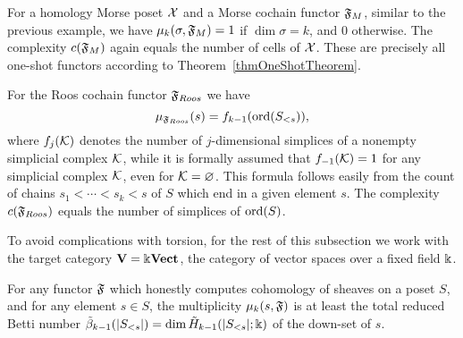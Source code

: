 \begin{ex}\label{exMultiplicityMorse}
For a homology Morse poset $\mathcal{X}$ and a Morse cochain functor $\mathfrak{F}_{M}$, similar to the previous example, we have $\mu_k(\sigma,\mathfrak{F}_M)=1$ if $\dim\sigma=k$, and $0$ otherwise. The complexity $c(\mathfrak{F}_{M})$ again equals the number of cells of $\mathcal{X}$. These are precisely all one-shot functors according to Theorem~\ref{thmOneShotTheorem}.
\end{ex}

\begin{ex}\label{exMultiplicityRoos}
For the Roos cochain functor $\mathfrak{F}_{Roos}$ we have
\[
\mu_{\mathfrak{F}_{Roos}}(s)=f_{k-1}(\operatorname{ord}(S_{<s})),
\]
where $f_{j}(\mathcal{K})$ denotes the number of $j$-dimensional simplices of a nonempty simplicial complex $\mathcal{K}$, while it is formally assumed that $f_{-1}(\mathcal{K})=1$ for any simplicial complex $\mathcal{K}$, even for $\mathcal{K}=\varnothing$. This formula follows easily from the count of chains $s_1<\cdots<s_k<s$ of $S$ which end in a given element $s$. The complexity $c(\mathfrak{F}_{Roos})$ equals the number of simplices of $\operatorname{ord}(S)$.
\end{ex}

To avoid complications with torsion, for the rest of this subsection we work with the target category $\mathbf{V}=\Bbbk\mathbf{Vect}$, the category of vector spaces over a fixed field $\Bbbk$.

\begin{thm}\label{thmMorseBound}
For any functor $\mathfrak{F}$ which honestly computes cohomology of sheaves on a poset $S$, and for any element $s\in S$, the multiplicity $\mu_k(s,\mathfrak{F})$ is at least the total reduced Betti number $\tilde{\beta}_{k-1}(|S_{<s}|)=\dim\tilde{H}_{k-1}(|S_{<s}|;\Bbbk)$ of the down-set of $s$.
\end{thm}


